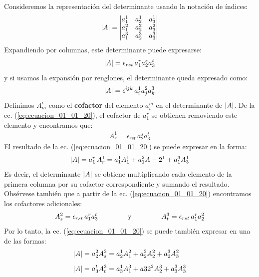 \documentclass[hidelinks,12pt]{article}
\begin{document}
Consideremos la representación del determinante usando la notación de índices:
\begin{align*}
\abs{A} = \mdet{
a_{1}^{1} & a_{2}^{1} & a_{3}^{1} \\
a_{1}^{2} & a_{2}^{2} & a_{3}^{2} \\
a_{1}^{3} & a_{2}^{3} & a_{3}^{3}}
\end{align*}
Expandiendo por columnas, este determinante puede expresarse:
\begin{align}
\abs{A} = \epsilon_{rst} \, a_{1}^{r} a_{2}^{s} a_{3}^{t}
\label{eq:ecuacion_01_01_20}
\end{align}
y si usamos la expansión por renglones, el determinante queda expresado como:
\begin{align}
\abs{A} = \epsilon^{ijk} \, a_{i}^{1} a_{j}^{2} a_{k}^{3}
\label{eq:ecuacion_01_01_21}
\end{align}
Definimos $A_{m}^{i}$ como el \textbf{cofactor} del elemento $a_{i}^{m}$ en el determinante de $\abs{A}$. De la ec. (\ref{eq:ecuacion_01_01_20}), el cofactor de $a_{1}^{r}$ se obtienen removiendo este elemento y encontramos que:
\begin{align}
A_{r}^{1} = \epsilon_{rst} \, a_{2}^{s} a_{3}^{t}
\label{eq:ecuacion_01_01_22}
\end{align}
El resultado de la ec. (\ref{eq:ecuacion_01_01_20}) se puede expresar en la forma:
\begin{align}
\abs{A} = a_{1}^{r} \, A_{r}^{1} = a_{1}^{1} A_{1}^{1} + a_{1}^{2} A-{2}^{1} + a_{1}^{3} A_{3}^{1}
\label{eq:ecuacion_01_01_23}
\end{align}
Es decir, el determinante $\abs{A}$ se obtiene multiplicando cada elemento de la primera columna por su cofactor correspondiente y sumando el resultado. Obsérvese también que a partir de la ec. (\ref{eq:ecuacion_01_01_20}) encontramos los cofactores adicionales:
\begin{align}
A_{s}^{2} = \epsilon_{rst} \, a_{1}^{r} a_{3}^{t} \hspace{1.5cm} \text{y} \hspace{1.5cm} A_{t}^{3} = \epsilon_{rst} \, a_{1}^{r} a_{2}^{2}
\label{eq:ecuacion_01_01_24}
\end{align}
Por lo tanto, la ec. (\ref{eq:ecuacion_01_01_20}) se puede también expresar en una de las formas:
\begin{align*}
\abs{A} &= a_{2}^{2} A_{s}^{2} = a_{2}^{1} A_{1}^{2} + a_{2}^{2} A_{2}^{2} + a_{2}^{3} A_{3}^{2} \\[0.5em]
\abs{A} &= a_{3}^{t} A_{t}^{3} = a_{3}^{1} A_{1}^{3} + a3{2}^{2} A_{2}^{3} + a_{3}^{3} A_{3}^{3}
\end{align*}
\end{document}
